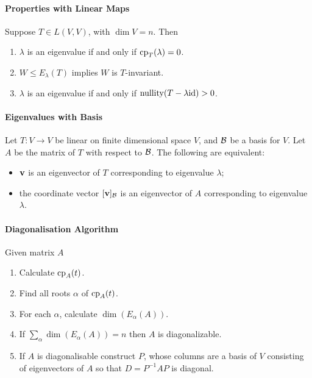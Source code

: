 \paragraph{Properties with Linear Maps}
Suppose \(T \in L(V,V)\), with \(\dim V = n\). Then
\begin{enumerate}
    \item \(\lambda\) is an eigenvalue if and only if \(\mathrm{cp}_T(\lambda) = 0\).
    \item \(W \leq E_\lambda(T)\) implies \(W\) is \(T\)-invariant.
    \item \(\lambda\) is an eigenvalue if and only if \(\mathrm{nullity}(T - \lambda\mathrm{id}) > 0\).
\end{enumerate}

\paragraph{Eigenvalues with Basis}
Let \(T: V \to V\) be linear on finite dimensional space \(V\), and \(\mathcal{B}\) be a basis for \(V\). Let \(A\) be the matrix of \(T\) with respect to \(\mathcal{B}\). The following are equivalent:
\begin{itemize}
    \item \(\mathbf{v}\) is an eigenvector of \(T\) corresponding to eigenvalue \(\lambda\);
    \item the coordinate vector \([\mathbf{v}]_{\mathcal{B}}\) is an eigenvector of \(A\) corresponding to eigenvalue \(\lambda\).
\end{itemize}

\paragraph{Diagonalisation Algorithm}
Given matrix \(A\)
\begin{enumerate}
    \item Calculate \(\mathrm{cp}_A(t)\).
    \item Find all roots \(\alpha\) of \(\mathrm{cp}_A(t)\).
    \item For each \(\alpha\), calculate \(\dim(E_\alpha(A))\).
    \item If \(\sum_\alpha \dim(E_\alpha(A)) = n\) then \(A\) is diagonalizable.
    \item If \(A\) is diagonalisable construct \(P\), whose columns are a basis of \(V\) consisting of eigenvectors of \(A\) so that \(D = P^{-1}AP\) is diagonal.
\end{enumerate}